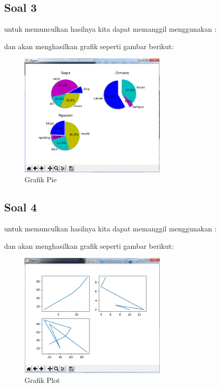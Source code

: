 \subsection{Soal 3}


untuk memunculkan hasilnya kita dapat memanggil menggunakan :


dan akan menghasilkan grafik seperti gambar berikut:
\begin{figure}[H]
\centering
\includegraphics[width=7cm]{figures/6/1174050/Praktek/ppie.png}
\caption{Grafik Pie}
\end{figure}

\subsection{Soal 4}

untuk memunculkan hasilnya kita dapat memanggil menggunakan :


dan akan menghasilkan grafik seperti gambar berikut:
\begin{figure}[H]
\centering
\includegraphics[width=7cm]{figures/6/1174050/Praktek/pplot.png}
\caption{Grafik Plot}
\end{figure}


